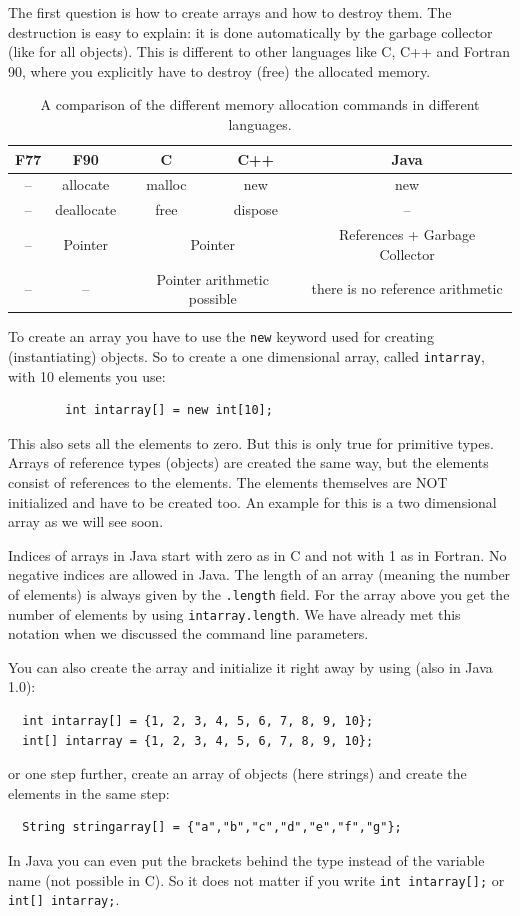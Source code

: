 The first question is how to create arrays and how to destroy them.
The destruction is easy to explain: it is done automatically
by the garbage collector (like for all objects). This is different to
other languages like C, C++ and Fortran 90, where you explicitly
have to destroy (free) the allocated memory. 
\begin{table}[htbp]
  \begin{center}
    \begin{tabular}{c|c|c|c|c}
      F77 & F90 & C & C++ & \textbf{Java} \\\hline
      -- & allocate & malloc & new & new \\
      -- & deallocate & free & dispose & -- \\
      -- & Pointer & \multicolumn{2}{c}{Pointer} & References + Garbage Collector \\
      -- & -- & \multicolumn{2}{c|}{Pointer arithmetic possible}& there is no 
                                                    reference arithmetic \\
    \end{tabular}
    \caption{A comparison of the different memory allocation commands in different languages.}
    \label{tab:MemoryAllocation}
  \end{center}
\end{table}
To create an array you have to use the \verb|new| keyword used for
creating (instantiating) objects. So to create a one dimensional
array, called \verb|intarray|, with 10 elements you use:
\begin{verbatim}
        int intarray[] = new int[10];
\end{verbatim}
This also sets all the elements to zero. But this is only true for 
primitive types. Arrays of reference types (objects) are created the
same way, but the elements consist of references to the elements. The
elements themselves are NOT initialized and have to be created too.
An example for this is a two dimensional array as we will see soon.

Indices of arrays in Java start with zero as in C and not with 1
as in Fortran. No negative indices are allowed in Java. The length
of an array (meaning the number of elements) is always given
by the \verb|.length| field. For the array above you get the number
of elements by using \verb|intarray.length|. We have already met
this notation when we discussed the command line parameters.

You can also create the array and initialize it right away by using
(also in Java 1.0):
\begin{verbatim}
  int intarray[] = {1, 2, 3, 4, 5, 6, 7, 8, 9, 10};
  int[] intarray = {1, 2, 3, 4, 5, 6, 7, 8, 9, 10};
\end{verbatim}
or one step further, create an array of objects (here strings) and
create the elements in the same step:
\begin{verbatim}
  String stringarray[] = {"a","b","c","d","e","f","g"};
\end{verbatim}
In Java you can even put the brackets behind the type instead of the
variable name (not possible in C). So it does not matter if you
write \verb|int intarray[];| or \verb|int[] intarray;|.

